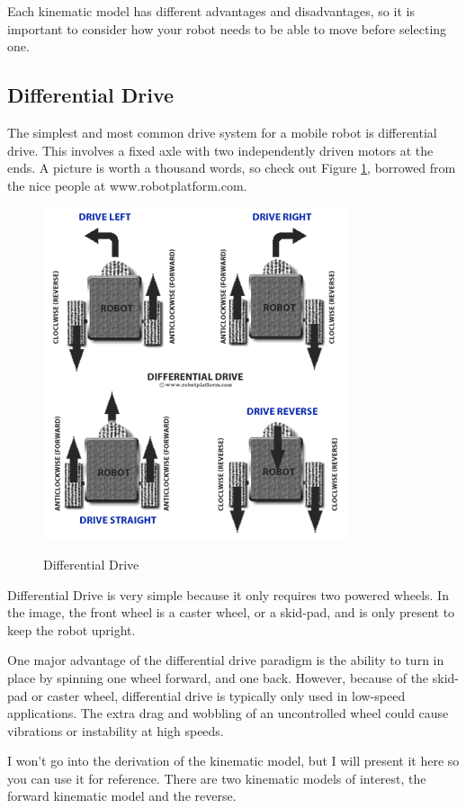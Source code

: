 Each kinematic model has different advantages and disadvantages, so it is important to consider how your robot needs to be able to move before selecting one.

\subsection{Differential Drive}

The simplest and most common drive system for a mobile robot is differential drive. This involves a fixed axle with two independently driven motors at the ends. A picture is worth a thousand words, so check out Figure \ref{fig:diffdrive}, borrowed from the nice people at www.robotplatform.com.

\begin{figure}[h]
\centering
\includegraphics[scale=0.75]{Differential_Drive.png}
\label{fig:diffdrive}
\caption{Differential Drive}
\end{figure}

Differential Drive is very simple because it only requires two powered wheels. In the image, the front wheel is a caster wheel, or a skid-pad, and is only present to keep the robot upright.

One major advantage of the differential drive paradigm is the ability to turn in place by spinning one wheel forward, and one back. However, because of the skid-pad or caster wheel, differential drive is typically only used in low-speed applications. The extra drag and wobbling of an uncontrolled wheel could cause vibrations or instability at high speeds.

I won't go into the derivation of the kinematic model, but I will present it here so you can use it for reference. There are two kinematic models of interest, the forward kinematic model and the reverse.

